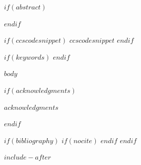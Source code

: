 \documentclass[$acmstyle$$if(fontsize)$,$fontsize$$endif$$if(review)$,review$endif$$if(anonymous)$,anonymous$endif$$if(screen)$,screen$endif$,natbib=false]{acmart}
\begin{document}
$if(abstract)$
\begin{abstract}
$abstract$
\end{abstract}
$endif$


$if(ccscodesnippet)$
$ccscodesnippet$
$endif$



$if(keywords)$
$endif$  %


\maketitle

$body$

$if(acknowledgments)$
\begin{acks}                            %
$acknowledgments$
\end{acks}
$endif$

$if(bibliography)$
$if(nocite)$
\nocite{*}
$endif$
\printbibliography
$endif$

$include-after$
\end{document}
